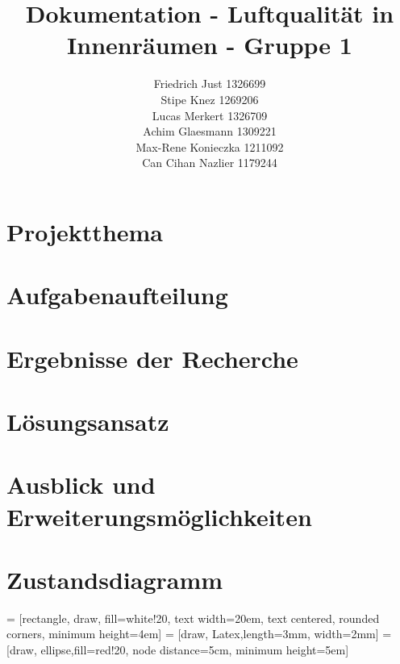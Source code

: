 \documentclass[]{article}
\title{Dokumentation - Luftqualität in Innenräumen - Gruppe 1}
\author{Friedrich Just 1326699 \\ Stipe Knez 1269206 \\ Lucas Merkert 1326709 \\ Achim Glaesmann 1309221 \\ Max-Rene Konieczka 1211092 \\ Can Cihan Nazlier 1179244}
\begin{document}
	\begin{titlepage}
		\maketitle
		\thispagestyle{empty}
	\end{titlepage}
	\tableofcontents
	\setcounter{page}{1}
	\newpage
	
	
	\section{Projektthema}
	\section{Aufgabenaufteilung}
	\section{Ergebnisse der Recherche}
	\section{Lösungsansatz}
		
	\section{Ausblick und Erweiterungsmöglichkeiten}
		
		
	\section{Zustandsdiagramm}
	 = [rectangle, draw, fill=white!20, text width=20em, text centered, rounded corners, minimum height=4em]
	 = [draw, Latex,length=3mm, width=2mm]
	 = [draw, ellipse,fill=red!20, node distance=5cm, minimum height=5em]
	
\end{document}
